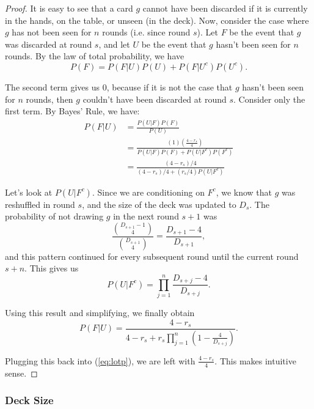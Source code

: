 \documentclass[11pt]{article}
\begin{document}
\begin{proof}
  It is easy to see that a card $g$ cannot have been discarded if it is currently in the hands, on the table, or unseen (in the deck). Now, consider the case where $g$ has not been seen for $n$ rounds (i.e. since round $s$). Let $F$ be the event that $g$ was discarded at round $s$, and let $U$ be the event that $g$ hasn't been seen for $n$ rounds. By the law of total probability, we have
\begin{equation}
  P(F) = P(F|U)P(U) + P(F|U^c)P(U^c).
\label{eq:lotp} \end{equation}

The second term gives us $0$, because if it is not the case that $g$ hasn't been seen for $n$ rounds, then $g$ couldn't have been discarded at round $s$. Consider only the first term. By Bayes' Rule, we have:
\begin{align}
  P(F|U) &= \frac{P(U|F)P(F)}{P(U)} \\
  &= \frac{(1)\left(\frac{4-r_s}{4}\right)}{P(U|F)P(F) + P(U|F^c)P(F^c)} \\
  &= \frac{(4-r_s)/4}{(4-r_s)/4 + (r_s/4)P(U|F^c)}
\end{align}

Let's look at $P(U|F^c)$. Since we are conditioning on $F^c$, we know that $g$ was reshuffled in round $s$, and the size of the deck was updated to $D_s$. The probability of not drawing $g$ in the next round $s+1$ was
\begin{equation}
  \frac{{D_{s+1}-1 \choose 4}}{{D_{s+1} \choose 4}} = \frac{D_{s+1}-4}{D_{s+1}},
\end{equation} and this pattern continued for every subsequent round until the current round $s+n$. This gives us
\begin{equation}
  P(U|F^c) = \prod_{j=1}^n \frac{D_{s+j} - 4}{D_{s+j}}.
\end{equation}

Using this result and simplifying, we finally obtain
\begin{equation}
  P(F|U) = \frac{4-r_s}{4-r_s+r_s\prod_{j=1}^n(1-\frac{4}{{D_{s+j}}})}.
\end{equation}

Plugging this back into (\ref{eq:lotp}), we are left with $\frac{4-r_s}{4}$. This makes intuitive sense. \end{proof}


\subsubsection{Deck Size}
\end{document}
